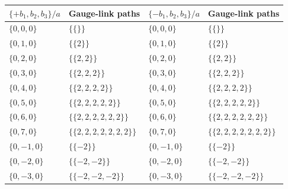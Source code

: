 \begin{table}[tb]
    \centering\footnotesize
\begin{ruledtabular}
\begin{tabular}{llll}
$\{+b_1,b_2,b_3\}/a$ & \parbox[t]{0.32\textwidth}{\raggedright Gauge-link paths} & $\{-b_1,b_2,b_3\}/a$ & \parbox[t]{0.32\textwidth}{\raggedright Gauge-link paths} \\
\hline
$\{0,0,0\}$ & \parbox[t]{0.32\textwidth}{\raggedright $\{$\mbox{$\{\}$}$\}$} & $\{0,0,0\}$ & \parbox[t]{0.32\textwidth}{\raggedright $\{$\mbox{$\{\}$}$\}$} \\
$\{0,1,0\}$ & \parbox[t]{0.32\textwidth}{\raggedright $\{$\mbox{$\{2\}$}$\}$} & $\{0,1,0\}$ & \parbox[t]{0.32\textwidth}{\raggedright $\{$\mbox{$\{2\}$}$\}$} \\
$\{0,2,0\}$ & \parbox[t]{0.32\textwidth}{\raggedright $\{$\mbox{$\{2,2\}$}$\}$} & $\{0,2,0\}$ & \parbox[t]{0.32\textwidth}{\raggedright $\{$\mbox{$\{2,2\}$}$\}$} \\
$\{0,3,0\}$ & \parbox[t]{0.32\textwidth}{\raggedright $\{$\mbox{$\{2,2,2\}$}$\}$} & $\{0,3,0\}$ & \parbox[t]{0.32\textwidth}{\raggedright $\{$\mbox{$\{2,2,2\}$}$\}$} \\
$\{0,4,0\}$ & \parbox[t]{0.32\textwidth}{\raggedright $\{$\mbox{$\{2,2,2,2\}$}$\}$} & $\{0,4,0\}$ & \parbox[t]{0.32\textwidth}{\raggedright $\{$\mbox{$\{2,2,2,2\}$}$\}$} \\
$\{0,5,0\}$ & \parbox[t]{0.32\textwidth}{\raggedright $\{$\mbox{$\{2,2,2,2,2\}$}$\}$} & $\{0,5,0\}$ & \parbox[t]{0.32\textwidth}{\raggedright $\{$\mbox{$\{2,2,2,2,2\}$}$\}$} \\
$\{0,6,0\}$ & \parbox[t]{0.32\textwidth}{\raggedright $\{$\mbox{$\{2,2,2,2,2,2\}$}$\}$} & $\{0,6,0\}$ & \parbox[t]{0.32\textwidth}{\raggedright $\{$\mbox{$\{2,2,2,2,2,2\}$}$\}$} \\
$\{0,7,0\}$ & \parbox[t]{0.32\textwidth}{\raggedright $\{$\mbox{$\{2,2,2,2,2,2,2\}$}$\}$} & $\{0,7,0\}$ & \parbox[t]{0.32\textwidth}{\raggedright $\{$\mbox{$\{2,2,2,2,2,2,2\}$}$\}$} \\
$\{0,-1,0\}$ & \parbox[t]{0.32\textwidth}{\raggedright $\{$\mbox{$\{-2\}$}$\}$} & $\{0,-1,0\}$ & \parbox[t]{0.32\textwidth}{\raggedright $\{$\mbox{$\{-2\}$}$\}$} \\
$\{0,-2,0\}$ & \parbox[t]{0.32\textwidth}{\raggedright $\{$\mbox{$\{-2,-2\}$}$\}$} & $\{0,-2,0\}$ & \parbox[t]{0.32\textwidth}{\raggedright $\{$\mbox{$\{-2,-2\}$}$\}$} \\
$\{0,-3,0\}$ & \parbox[t]{0.32\textwidth}{\raggedright $\{$\mbox{$\{-2,-2,-2\}$}$\}$} & $\{0,-3,0\}$ & \parbox[t]{0.32\textwidth}{\raggedright $\{$\mbox{$\{-2,-2,-2\}$}$\}$} \\

\end{tabular}
\end{ruledtabular}
\end{table}

